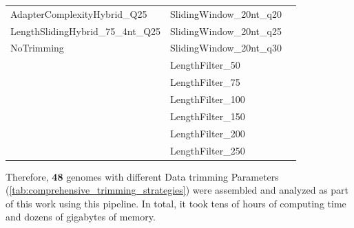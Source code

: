\begin{table}[h!]
{\begin{tabular}{|l|l|l|}
AdapterComplexityHybrid\_Q25               & SlidingWindow\_20nt\_q20                &                                      \\
LengthSlidingHybrid\_75\_4nt\_Q25           & SlidingWindow\_20nt\_q25                &                                      \\
NoTrimming                                  & SlidingWindow\_20nt\_q30                &                                      \\
                                            & LengthFilter\_50                        &                                      \\
                                            & LengthFilter\_75                        &                                      \\
                                            & LengthFilter\_100                       &                                      \\
                                            & LengthFilter\_150                       &                                      \\
                                            & LengthFilter\_200                       &                                      \\
                                            & LengthFilter\_250                       &                                      \\ \hline
\end{tabular}%
}
\end{table}


Therefore, \textbf{48} \gls{genome}s with different Data \gls{trimming} Parameters (\autoref{tab:comprehensive_trimming_strategies}) were assembled and analyzed as part of this work using this pipeline. In total, it took tens of hours of computing time and dozens of gigabytes of memory.







